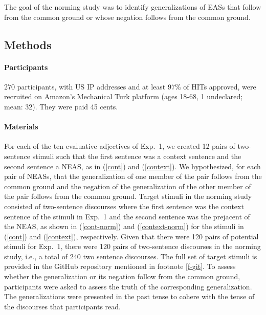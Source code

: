 \documentclass[11pt,fleqn]{article}
\newcommand{\6}{\mbox{$[\hspace*{-.6mm}[$}}
\newcommand{\9}{\mbox{$]\hspace*{-.6mm}]$}}
\begin{document}
The goal of the norming study was to identify generalizations of EASs that follow from the common ground or whose negation follows from the common ground. 

\subsection{Methods}

\paragraph{Participants} 270 participants, with US IP addresses and at least 97\% of HITs approved, were recruited on Amazon's Mechanical Turk platform (ages 18-68, 1 undeclared; mean: 32). They were paid 45 cents.


\paragraph{Materials} For each of the ten evaluative adjectives of Exp.~1, we created 12 pairs of two-sentence stimuli such that the first sentence was a context sentence and the second sentence a NEAS, as in (\ref{cont}) and (\ref{context}). We hypothesized, for each pair of NEASs, that the generalization of one member of the pair follows from the common ground and the negation of the generalization of the other member of the pair follows from the common ground. Target stimuli in the norming study consisted of two-sentence discourses where the first sentence was the context sentence of the stimuli in Exp.~1 and the second sentence was the prejacent of the NEAS, as shown in (\ref{cont-norm}) and (\ref{context-norm}) for the stimuli in (\ref{cont}) and (\ref{context}), respectively. Given that there were 120 pairs of potential stimuli for Exp.~1, there were 120 pairs of two-sentence discourses in the norming study, i.e., a total of 240 two sentence discourses. The full set of target stimuli is provided in the GitHub repository mentioned in footnote \ref{f-git}. To assess whether the generalization or its negation follow from the common ground, participants were asked to assess the truth of the corresponding generalization. The generalizations were presented in the past tense to cohere with the tense of the discourses that participants read.
\end{document}
